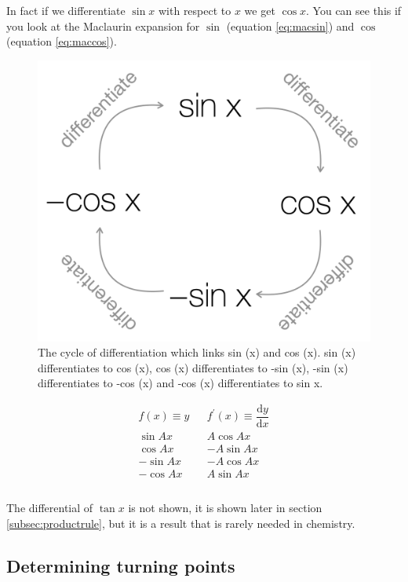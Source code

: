 \documentclass[
]{book}
\begin{document}
In fact if we differentiate \(\sin x\) with respect to \(x\) we get \(\cos x\). You can see this if you look at the Maclaurin expansion for \(\sin\) (equation \eqref{eq:macsin}) and \(\cos\) (equation \eqref{eq:maccos}).

\begin{figure}

{\centering \includegraphics[width=0.6\linewidth]{images/difftrigcycle} 

}

\caption{The cycle of differentiation which links sin (x) and cos (x). sin (x) differentiates to cos (x), cos (x) differentiates to -sin (x), -sin (x) differentiates to -cos (x) and -cos (x) differentiates to sin x.}\label{fig:difftrig}
\end{figure}

\begin{equation}
\begin{array}{ccc}
  f(x) \equiv y & & f^{\prime}(x) \equiv \dfrac{\textrm{d}y}{\textrm{d}x}\\
  \hline
\sin Ax & &A\cos Ax \\
\cos Ax & &-A\sin Ax \\
-\sin Ax & &-A\cos Ax \\
-\cos Ax & &A\sin Ax \\
\\
\end{array}
\end{equation}

The differential of \(\tan x\) is not shown, it is shown later in section \ref{subsec:productrule}, but it is a result that is rarely needed in chemistry.

\hypertarget{subsec:turningpoints}{%
\subsection{Determining turning points}\label{subsec:turningpoints}}
\end{document}
